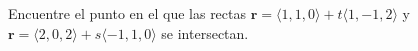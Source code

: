 \item Encuentre el punto en el que las rectas $\mathbf{r} = \langle 1, 1, 0 \rangle + t\langle 1, -1, 2 \rangle$ y $\mathbf{r} = \langle 2, 0, 2 \rangle + s\langle -1, 1, 0 \rangle$ se intersectan.
